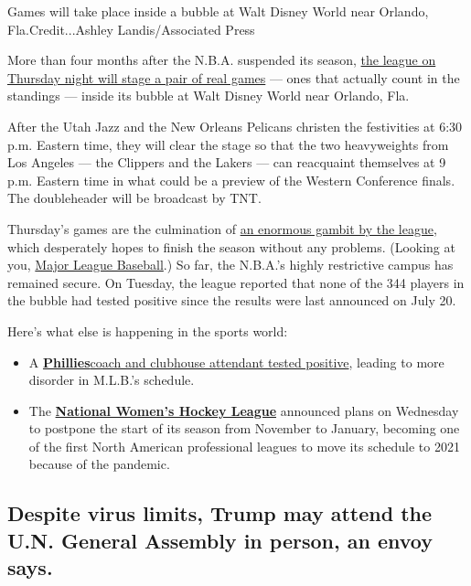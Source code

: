 Games will take place inside a bubble at Walt Disney World near Orlando,
Fla.Credit...Ashley Landis/Associated Press

More than four months after the N.B.A. suspended its season,
\href{https://www.nytimes.com/2020/07/30/sports/basketball/nba-schedule.html}{the
league on Thursday night will stage a pair of real games} --- ones that
actually count in the standings --- inside its bubble at Walt Disney
World near Orlando, Fla.

After the Utah Jazz and the New Orleans Pelicans christen the
festivities at 6:30 p.m. Eastern time, they will clear the stage so that
the two heavyweights from Los Angeles --- the Clippers and the Lakers
--- can reacquaint themselves at 9 p.m. Eastern time in what could be a
preview of the Western Conference finals. The doubleheader will be
broadcast by TNT.

Thursday's games are the culmination of
\href{https://www.nytimes.com/article/nba-return-health-rules.html}{an
enormous gambit by the league}, which desperately hopes to finish the
season without any problems. (Looking at you,
\href{https://www.nytimes.com/2020/07/27/sports/baseball/marlins-game-canceled.html}{Major
League Baseball}.) So far, the N.B.A.'s highly restrictive campus has
remained secure. On Tuesday, the league reported that none of the 344
players in the bubble had tested positive since the results were last
announced on July 20.

Here's what else is happening in the sports world:

\begin{itemize}
\item
  A
  \textbf{\href{https://www.nytimes.com/2020/07/30/sports/baseball/phillies-blue-jays-postponed-coronavirus.html}{Phillies}}\href{https://www.nytimes.com/2020/07/30/sports/baseball/phillies-blue-jays-postponed-coronavirus.html}{coach
  and clubhouse attendant tested positive}, leading to more disorder in
  M.L.B.'s schedule.
\item
  The
  \textbf{\href{https://www.nytimes.com/2020/07/30/sports/hockey/nwhl-postpone-season.html}{National
  Women's Hockey League}} announced plans on Wednesday to postpone the
  start of its season from November to January, becoming one of the
  first North American professional leagues to move its schedule to 2021
  because of the pandemic.
\end{itemize}

\hypertarget{despite-virus-limits-trump-may-attend-the-un-general-assembly-in-person-an-envoy-says}{%
\subsection{Despite virus limits, Trump may attend the U.N. General
Assembly in person, an envoy
says.}\label{despite-virus-limits-trump-may-attend-the-un-general-assembly-in-person-an-envoy-says}}

